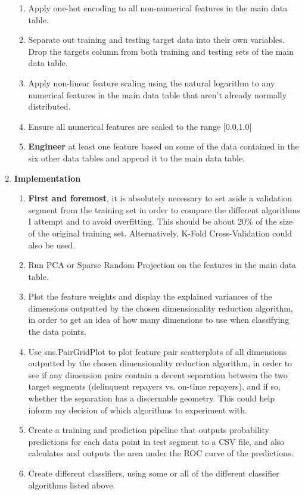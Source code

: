 \documentclass[12pt, letterpaper]{article}
\begin{document}
\begin{enumerate}
\begin{enumerate}
      \item Apply one-hot encoding to all non-numerical features in the main data table.
      \item Separate out training and testing target data into their own variables. Drop the targets column from both training and testing sets of the main data table.
      \item Apply non-linear feature scaling using the natural logarithm to any numerical features in the main data table that aren't already normally distributed.
      \item Ensure all numerical features are scaled to the range [0.0,1.0]
      \item \textbf{Engineer} at least one feature based on some of the data contained in the six other data tables and append it to the main data table.
    \end{enumerate}
  \item \textbf{Implementation}
    \begin{enumerate}
      \item \textbf{First and foremost}, it is absolutely necessary to set aside a validation segment from the training set in order to compare the different algorithms I attempt and to avoid overfitting. This should be about 20\% of the size of the original training set. Alternatively, K-Fold Cross-Validation could also be used.
      \item Run PCA or Sparse Random Projection on the features in the main data table.
      \item Plot the feature weights and display the explained variances of the dimensions outputted by the chosen dimensionality reduction algorithm, in order to get an idea of how many dimensions to use when classifying the data points.
      \item Use sns.PairGridPlot to plot feature pair scatterplots of all dimensions outputted by the chosen dimensionality reduction algorithm, in order to see if any dimension pairs contain a decent separation between the two target segments (delinquent repayers vs. on-time repayers), and if so, whether the separation has a discernable geometry. This could help inform my decision of which algorithms to experiment with.
      \item Create a training and prediction pipeline that outputs probability predictions for each data point in test segment to a CSV file, and also calculates and outputs the area under the ROC curve of the predictions.
      \item Create different classifiers, using some or all of the different classifier algorithms listed above.

\end{enumerate}
\end{enumerate}
\end{document}
